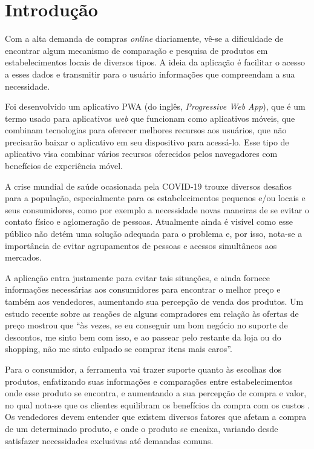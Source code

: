 \section{Introdução}
\label{sec:introducao}

Com a alta demanda de compras \textit{online} diariamente, vê-se a dificuldade de encontrar algum mecanismo de comparação e pesquisa de produtos em estabelecimentos locais de diversos tipos. A ideia da aplicação é facilitar o acesso a esses dados e transmitir para o usuário informações que compreendam a sua necessidade.

Foi desenvolvido um aplicativo PWA (do inglês, \textit{Progressive Web App}), que é um termo usado para aplicativos \textit{web} que funcionam como aplicativos móveis, que combinam tecnologias para oferecer melhores recursos aos usuários, que não precisarão baixar o aplicativo em seu dispositivo para acessá-lo. Esse tipo de aplicativo visa combinar vários recursos oferecidos pelos navegadores com benefícios de experiência móvel. \cite{souza2017pwa}

A crise mundial de saúde ocasionada pela COVID-19 trouxe diversos desafios para a população, especialmente para os estabelecimentos pequenos e/ou locais e seus consumidores, como por exemplo a necessidade novas maneiras de se evitar o contato físico e aglomeração de pessoas. Atualmente ainda é visível como esse público não detém uma solução adequada para o problema e, por isso, nota-se a importância de evitar agrupamentos de pessoas e acessos simultâneos aos mercados.

A aplicação entra justamente para evitar tais situações, e ainda fornece informações necessárias aos consumidores para encontrar o melhor preço e também aos vendedores, aumentando sua percepção de venda dos produtos. Um estudo recente sobre as reações de alguns compradores em relação às ofertas de preço mostrou que ``às vezes, se eu conseguir um bom negócio no suporte de descontos, me sinto bem com isso, e  ao passear pelo restante da loja ou do shopping, não me sinto culpado se comprar itens mais caros''. \cite{grewal1998effects}

Para o consumidor, a ferramenta vai trazer suporte quanto às escolhas dos produtos, enfatizando suas informações e comparações entre estabelecimentos onde esse produto se encontra, e aumentando a sua percepção de compra e valor, no qual nota-se que os clientes equilibram os benefícios da compra com os custos \cite{grewal1998effects}. Os vendedores devem entender que existem diversos fatores que afetam a compra de um determinado produto, e onde o produto se encaixa, variando desde satisfazer necessidades exclusivas até demandas comuns. \cite{grewal1998effects}
